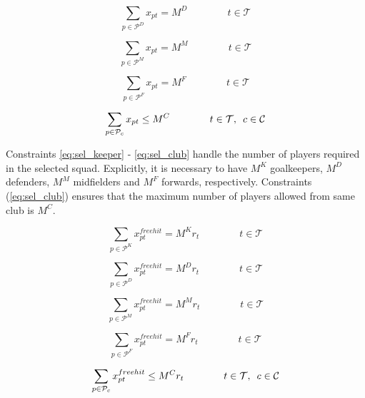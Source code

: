 \begin{equation} \label{eq_sel_defender}
    \sum_{p \in \mathcal{P}^{D}} x_{pt} = M^{D} \qquad\qquad t \in \mathcal{T}
\end{equation}


\begin{equation} \label{eq:sel_midfielder}
    \sum_{p \in \mathcal{P}^{M}} x_{pt} = M^{M} \qquad\qquad t \in \mathcal{T}
\end{equation}

\begin{equation} \label{eq:sel_forward}
    \sum_{p \in \mathcal{P}^{F}} x_{pt} = M^{F} \qquad\qquad t \in \mathcal{T}
\end{equation}

\begin{equation} \label{eq:sel_club}
    \sum_{p \in \mathcal{P}_{c}} x_{pt} \leq M^{C} \qquad\qquad t \in \mathcal{T}, \enskip   c \in \mathcal{C}
\end{equation}

Constraints \eqref{eq:sel_keeper} - \eqref{eq:sel_club} handle the number of players required in the selected squad. Explicitly, it is necessary to have $M^{K}$ goalkeepers, $M^{D}$ defenders, $M^{M}$ midfielders and $M^{F}$ forwards, respectively. Constraints (\ref{eq:sel_club}) ensures that the maximum number of players allowed from same club is $M^{C}$. 

\begin{equation} \label{eq:free_hit_sel_keeper}
    \sum_{p \in \mathcal{P}^{K}} x_{pt}^{free hit} = M^{K}r_{t}  \qquad\qquad t \in \mathcal{T}
\end{equation}

\begin{equation} \label{eq:free_hit_sel_defender}
    \sum_{p \in \mathcal{P}^{D}} x_{pt}^{free hit} = M^{D}r_{t} \qquad\qquad t \in \mathcal{T}
\end{equation}

\begin{equation} \label{eq:free_hit_sel_midfielder}
    \sum_{p \in \mathcal{P}^{M}} x_{pt}^{free hit} = M^{M}r_{t} \qquad\qquad t \in \mathcal{T}
\end{equation}

\begin{equation} \label{eq:free_hit_sel_forward}
    \sum_{p \in \mathcal{P}^{F}} x_{pt}^{free hit} = M^{F}r_{t} \qquad\qquad t \in \mathcal{T}
\end{equation}

\begin{equation} \label{eq:free_hit_sel_club}
    \sum_{p \in \mathcal{P}_{c}} x_{pt}^{free hit} \leq M^{C}r_{t} \qquad\qquad t \in \mathcal{T}, \enskip   c \in \mathcal{C}
\end{equation}



